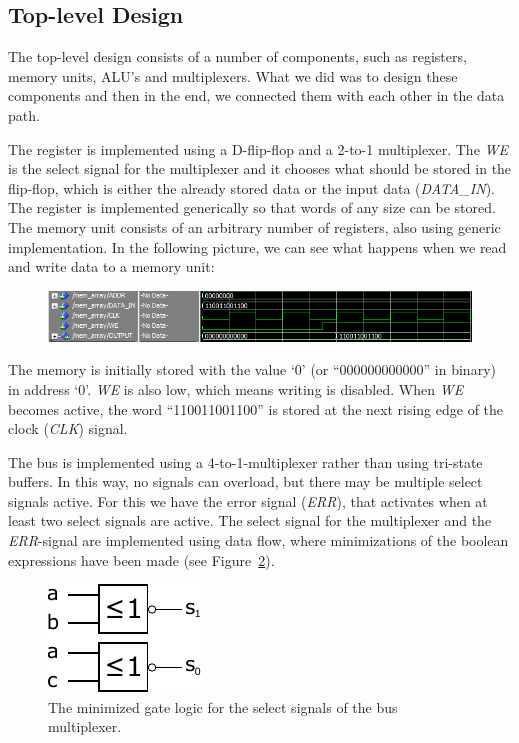 \documentclass[a4,11pt]{article}
\begin{document}
\newpage

\subsection{Top-level Design}

The top-level design consists of a number of components, such as registers, memory units, ALU's
and multiplexers. What we did was to design these components and then in the end, we connected
them with each other in the data path.

The register is implemented using a D-flip-flop and a 2-to-1 multiplexer. The {\it WE} is the select
signal for the multiplexer and it chooses what should be stored in the flip-flop, which is either
the already stored data or the input data ({\it DATA\_IN}). The register is implemented
generically so that words of any size can be stored. The memory unit consists of an arbitrary number
of registers, also using generic implementation. In the following picture, we can see what happens
when we read and write data to a memory unit:

\begin{figure}[h!]
	\centering
	\includegraphics[width=1\textwidth]{Figurer/data_memory}
	\label{fig:sim}
\end{figure}

The memory is initially stored with the value `0' (or ``000000000000'' in binary) in address `0'.
{\it WE} is also low, which means writing is disabled. When {\it WE} becomes active, the word
``110011001100'' is stored at the next rising edge of the clock ({\it CLK}) signal.

The bus is implemented using a 4-to-1-multiplexer rather than using tri-state buffers. In this
way, no signals can overload, but there may be multiple select signals active. For this we have
the error signal ({\it ERR}), that activates when at least two select signals are active. The
select signal for the multiplexer and the {\it ERR}-signal are implemented using data flow, where
minimizations of the boolean expressions have been made (see Figure~\ref{fig:enc}).

\begin{figure}[h!]
	\centering
	\includegraphics[width=.3\textwidth]{Figurer/enc4b}
	\caption{The minimized gate logic for the select signals of the bus multiplexer.}
	\label{fig:enc}
\end{figure}
\end{document}
